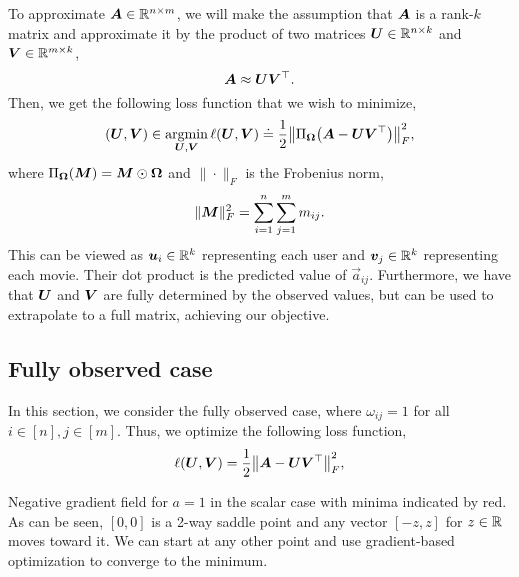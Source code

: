 To approximate $\bm{A} \in \mathbb{R}^{n \times m}$, we will make the assumption that $\bm{A}$ is a
rank-$k$ matrix and approximate it by the product of two matrices $\bm{U} \in \mathbb{R}^{n \times k}$ and
$\bm{V} \in \mathbb{R}^{m \times k}$, \[
    \bm{A} \approx \bm{U} \bm{V}^\top.
\]
Then, we get the following loss function that we wish to minimize, \[
    (\mat{U}, \mat{V}) \in \argmin_{\mat{U}, \mat{V}} \ell(\mat{U}, \mat{V}) \doteq \frac{1}{2} \lft\| \Pi_{\mat{\Omega}} \lft( \mat{A} - \mat{U}\transpose{\mat{V}} \rgt) \rgt\|_F^2,
\]
where $\Pi_{\bm{\Omega}}(\bm{M}) = \bm{M} \odot \bm{\Omega}$ and $\| \cdot \|_F$ is the
Frobenius norm, \[
    \| \bm{M} \|_F^2 = \sum_{i=1}^{n} \sum_{j=1}^{m} m_{ij}.
\]
This can be viewed as $\bm{u}_i \in \mathbb{R}^k$ representing each user and $\bm{v}_j \in \mathbb{R}^k$
representing each movie. Their dot product is the predicted value of $\vec{a}_{ij}$. Furthermore,
we have that $\bm{U}$ and $\bm{V}$ are fully determined by the observed values, but can be used
to extrapolate to a full matrix, achieving our objective.

\subsection{Fully observed case}

In this section, we consider the fully observed case, where $\omega_{ij}=1$ for all $i \in [n],
    j\in [m]$. Thus, we optimize \wrt the following loss function, \[
    \ell(\mat{U}, \mat{V}) = \frac{1}{2} \lft\| \mat{A} - \mat{U}\transpose{\mat{V}} \rgt\|_F^2,
\]

\begin{marginfigure}
    \centering
    \caption{Negative gradient field for $a=1$ in the scalar case with minima indicated by red. As can be seen, $[0,0]$ is a 2-way saddle point and any vector $[-z,z]$ for $z\in\mathbb{R}$ moves toward it. We can start at any other point and use gradient-based optimization to converge to the minimum.}
    \label{fig:grad-field}
\end{marginfigure}

